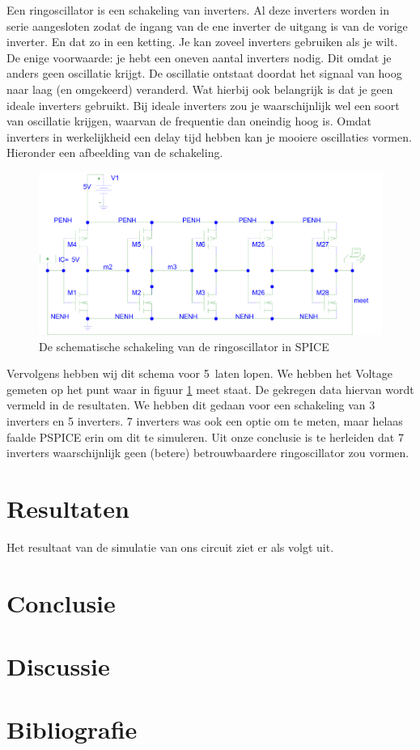 \documentclass{scrartcl}  %
\begin{document}
Een ringoscillator is een schakeling van inverters. Al deze inverters worden in serie aangesloten zodat de ingang van de ene inverter de uitgang is van de vorige inverter. En dat zo in een ketting. Je kan zoveel inverters gebruiken als je wilt. De enige voorwaarde: je hebt een oneven aantal inverters nodig. Dit omdat je anders geen oscillatie krijgt. De oscillatie ontstaat doordat het signaal van hoog naar laag (en omgekeerd) veranderd. Wat hierbij ook belangrijk is dat je geen ideale inverters gebruikt. Bij ideale inverters zou je waarschijnlijk wel een soort van oscillatie krijgen, waarvan de frequentie dan oneindig hoog is. Omdat inverters in werkelijkheid een delay tijd hebben kan je mooiere oscillaties vormen. Hieronder een afbeelding van de schakeling.
\begin{figure}[H]
\centering
	
	\includegraphics[width=\linewidth]{images/ringoscillator2.png}
	\caption{De schematische schakeling van de ringoscillator in SPICE}
	\label{fig:schema}
\end{figure}
Vervolgens hebben wij dit schema voor 5\nano\second\  laten lopen. We hebben het Voltage gemeten op het punt waar in figuur \ref{fig:schema} meet staat. De gekregen data hiervan wordt vermeld in de resultaten. We hebben dit gedaan voor een schakeling van 3 inverters en 5 inverters. 7 inverters was ook een optie om te meten, maar helaas faalde PSPICE erin om dit te simuleren. Uit onze conclusie is te herleiden dat 7 inverters waarschijnlijk geen (betere) betrouwbaardere ringoscillator zou vormen.

\section{Resultaten}
Het resultaat van de simulatie van ons circuit ziet er als volgt uit.
\section{Conclusie}


\section{Discussie}


\newpage
{}
\section{Bibliografie}
\printbibliography
\end{document}
